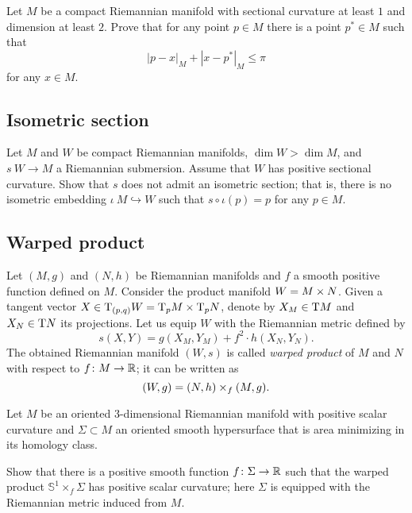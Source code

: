 \begin{pr}
Let $M$ be a compact Riemannian manifold with sectional curvature at least $1$ 
and dimension at least $2$. 
Prove that for any point $p\in M$ there is a point $p^*\in M$ such that 
\[|p-x|_M+|x-p^*|_M\le \pi\]
for any $x\in M$.
\end{pr}

\subsection*{Isometric section\hard}
\label{Isometric section}

\begin{pr}
Let $M$ and $W$ be compact Riemannian manifolds,
$\dim W>\dim M$,
and $s\:W\to M$ a Riemannian submersion.
Assume that $W$ has positive sectional curvature.
Show that $s$ does not admit an isometric section;
that is, there is no isometric embedding $\iota\:M\hookrightarrow W$ such that $s\circ\iota(p)=p$ for any $p\in M$.
\end{pr}

\subsection*{Warped product}
\label{Warped product}
\label{page:warped product}

Let $(M,g)$ and $(N,h)$ be Riemannian manifolds 
and $f$ a smooth positive function defined on $M$.
Consider the product manifold $W\z=M\times N$.
Given a tangent vector 
$X\z\in \T_{(p,q)} W
\z=\T_p M\times \T_p N$, denote by 
$X_M\z\in \T M$ and $X_N\z\in \T N$ its projections.
Let us equip $W$ with the Riemannian metric defined by
\[s(X,Y)=g(X_M,Y_M)+f^2\cdot h(X_N,Y_N).\]
The obtained Riemannian manifold $(W,s)$ is called \emph{warped product} of $M$ and $N$ with respect to $f\colon M\to \mathbb{R}$;
it can be written as  
\[(W,g)\z=(N,h)\times_f(M,g).\]

\begin{pr}
Let $M$ be an oriented 3-dimensional Riemannian manifold with positive scalar curvature 
and $\Sigma\subset M$ an oriented smooth hypersurface that is area minimizing in its homology class.

Show that there is a positive smooth function $f\colon\Sigma\to \mathbb{R}$
such that the warped product $\mathbb S^1\times_f \Sigma$
has positive scalar curvature;
here $\Sigma$ is equipped with the Riemannian metric
induced from $M$.
\end{pr}

